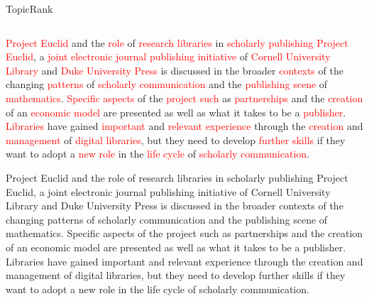 \begin{frame}{TopicRank}
\begin{columns}
\begin{column}{.55\textwidth}
{{            }{ %
              \begin{exampleblock}{\footnotesize \textcolor{red}{Project Euclid}
                                   and the \textcolor{red}{role} of
                                   \textcolor{red}{research libraries} in
                                   \textcolor{red}{scholarly publishing}}
                \footnotesize \textcolor{red}{Project Euclid}, a
                \textcolor{red}{joint electronic journal publishing initiative}
                of \textcolor{red}{Cornell University Library} and
                \textcolor{red}{Duke University Press} is discussed in the
                broader \textcolor{red}{contexts} of the changing
                \textcolor{red}{patterns} of \textcolor{red}{scholarly
                communication} and the \textcolor{red}{publishing scene} of
                \textcolor{red}{mathematics}. \textcolor{red}{Specific aspects}
                of the \textcolor{red}{project such} as
                \textcolor{red}{partnerships} and the \textcolor{red}{creation}
                of an \textcolor{red}{economic model} are presented as well as
                what it takes to be a \textcolor{red}{publisher}.
                \textcolor{red}{Libraries} have gained
                \textcolor{red}{important} and \textcolor{red}{relevant
                experience} through the \textcolor{red}{creation} and
                \textcolor{red}{management} of \textcolor{red}{digital
                libraries}, but they need to develop \textcolor{red}{further
                skills} if they want to adopt a \textcolor{red}{new role} in the
                \textcolor{red}{life cycle} of \textcolor{red}{scholarly
                communication}.
              \end{exampleblock}
            }
          }{ %
            \begin{exampleblock}{\footnotesize Project Euclid and the role of
                                 research libraries in scholarly publishing}
              \footnotesize Project Euclid, a joint electronic journal
              publishing initiative of Cornell University Library and Duke
              University Press is discussed in the broader contexts of the
              changing patterns of scholarly communication and the publishing
              scene of mathematics. Specific aspects of the project such as
              partnerships and the creation of an economic model are presented
              as well as what it takes to be a publisher. Libraries have gained
              important and relevant experience through the creation and
              management of digital libraries, but they need to develop further
              skills if they want to adopt a new role in the life cycle of
              scholarly communication.
            \end{exampleblock}
          }
        \endminipage
      \end{column}
    \end{columns}
  \end{frame}

